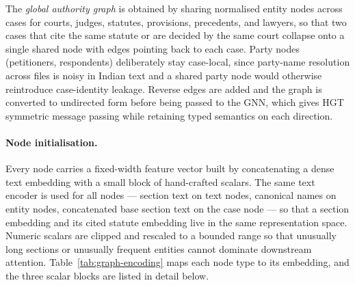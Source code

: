 \documentclass[runningheads]{llncs}
\begin{document}
The \emph{global authority graph} is obtained by sharing normalised entity nodes across cases for courts, judges, statutes, provisions, precedents, and lawyers, so that two cases that cite the same statute or are decided by the same court collapse onto a single shared node with edges pointing back to each case. Party nodes (petitioners, respondents) deliberately stay case-local, since party-name resolution across files is noisy in Indian text and a shared party node would otherwise reintroduce case-identity leakage. Reverse edges are added and the graph is converted to undirected form before being passed to the GNN, which gives HGT symmetric message passing while retaining typed semantics on each direction.

\paragraph{Node initialisation.}
Every node carries a fixed-width feature vector built by concatenating a dense text embedding with a small block of hand-crafted scalars. The same text encoder is used for all nodes --- section text on text nodes, canonical names on entity nodes, concatenated base section text on the case node --- so that a section embedding and its cited statute embedding live in the same representation space. Numeric scalars are clipped and rescaled to a bounded range so that unusually long sections or unusually frequent entities cannot dominate downstream attention. Table~\ref{tab:graph-encoding} maps each node type to its embedding, and the three scalar blocks are listed in detail below.
\end{document}
